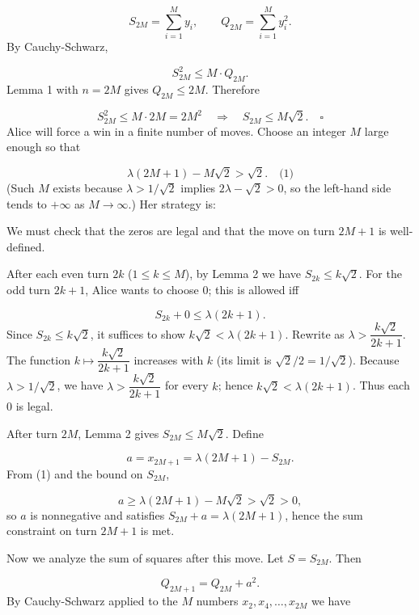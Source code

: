 \[
S_{2M} = \sum_{i=1}^M y_i, \qquad Q_{2M} = \sum_{i=1}^M y_i^2.
\]
By Cauchy-Schwarz,\par
\[
S_{2M}^2 \le M\cdot Q_{2M}.
\]
Lemma 1 with \(n=2M\) gives \(Q_{2M}\le 2M\). Therefore\par
\[
S_{2M}^2 \le M\cdot 2M = 2M^2 \quad\Longrightarrow\quad S_{2M}\le M\sqrt{2}. \quad\square
\]
\smallskip
{}
Alice will force a win in a finite number of moves. Choose an integer \(M\) large enough so that\par
\[
\lambda(2M+1)-M\sqrt{2} > \sqrt{2}. \quad\text{(1)}
\]
(Such \(M\) exists because \(\lambda > 1/\sqrt{2}\) implies \(2\lambda-\sqrt{2}>0\), so the left-hand side tends to \(+\infty\) as \(M\to\infty\).) Her strategy is:\par
{}
We must check that the zeros are legal and that the move on turn \(2M+1\) is well-defined.\par
{}
After each even turn \(2k\) (\(1\le k\le M\)), by Lemma 2 we have \(S_{2k}\le k\sqrt{2}\). For the odd turn \(2k+1\), Alice wants to choose \(0\); this is allowed iff\par
\[
S_{2k}+0 \le \lambda(2k+1).
\]
Since \(S_{2k}\le k\sqrt{2}\), it suffices to show \(k\sqrt{2} < \lambda(2k+1)\). Rewrite as \(\lambda > \dfrac{k\sqrt{2}}{2k+1}\). The function \(k\mapsto \dfrac{k\sqrt{2}}{2k+1}\) increases with \(k\) (its limit is \(\sqrt{2}/2 = 1/\sqrt{2}\)). Because \(\lambda > 1/\sqrt{2}\), we have \(\lambda > \dfrac{k\sqrt{2}}{2k+1}\) for every \(k\); hence \(k\sqrt{2} < \lambda(2k+1)\). Thus each \(0\) is legal.\par
{}
After turn \(2M\), Lemma 2 gives \(S_{2M}\le M\sqrt{2}\). Define\par
\[
a = x_{2M+1} = \lambda(2M+1)-S_{2M}.
\]
From (1) and the bound on \(S_{2M}\),\par
\[
a \ge \lambda(2M+1)-M\sqrt{2} > \sqrt{2} > 0,
\]
so \(a\) is nonnegative and satisfies \(S_{2M}+a = \lambda(2M+1)\), hence the sum constraint on turn \(2M+1\) is met.\par
Now we analyze the sum of squares after this move. Let \(S = S_{2M}\). Then\par
\[
Q_{2M+1} = Q_{2M} + a^2.
\]
By Cauchy-Schwarz applied to the \(M\) numbers \(x_2,x_4,\dots,x_{2M}\) we have\par
